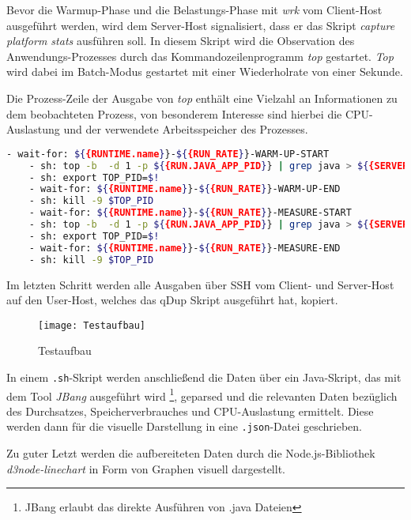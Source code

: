 Bevor die Warmup-Phase und die Belastungs-Phase mit \textit{wrk} vom Client-Host ausgeführt werden, wird dem Server-Host signalisiert, dass
er das Skript \textit{capture platform stats} ausführen soll.
In diesem Skript wird die Observation des Anwendungs-Prozesses durch das Kommandozeilenprogramm \textit{top} gestartet.
\textit{Top} wird dabei im Batch-Modus gestartet mit einer Wiederholrate von einer Sekunde.

Die Prozess-Zeile der Ausgabe von \textit{top} enthält eine Vielzahl an Informationen zu dem beobachteten Prozess, von besonderem
Interesse sind hierbei die CPU-Auslastung und der verwendete Arbeitsspeicher des Prozesses.

\begin{lstlisting}[language=sh, caption=Auszug des qDup Skripts capture-platform-stats, captionpos=b]
    - wait-for: ${{RUNTIME.name}}-${{RUN_RATE}}-WARM-UP-START
    - sh: top -b  -d 1 -p ${{RUN.JAVA_APP_PID}} | grep java > ${{SERVER_FILE_PATH}}/output/${{RUNTIME.name}}-${{RUN_RATE}}-WARM-UP-top.out &
    - sh: export TOP_PID=$!
    - wait-for: ${{RUNTIME.name}}-${{RUN_RATE}}-WARM-UP-END
    - sh: kill -9 $TOP_PID
    - wait-for: ${{RUNTIME.name}}-${{RUN_RATE}}-MEASURE-START
    - sh: top -b  -d 1 -p ${{RUN.JAVA_APP_PID}} | grep java > ${{SERVER_FILE_PATH}}/output/${{RUNTIME.name}}-${{RUN_RATE}}-MEASURE-top.out &
    - sh: export TOP_PID=$!
    - wait-for: ${{RUNTIME.name}}-${{RUN_RATE}}-MEASURE-END
    - sh: kill -9 $TOP_PID
  \end{lstlisting}

Im letzten Schritt werden alle Ausgaben über SSH vom Client- und Server-Host auf den User-Host, welches das qDup Skript ausgeführt hat, kopiert.

\begin{figure}[h!]
    \centering
    \texttt{[image: Testaufbau]}
    \caption{Testaufbau}
\end{figure}

In einem \verb|.sh|-Skript werden anschließend die Daten über ein Java-Skript, das mit dem Tool \textit{JBang} ausgeführt
wird \footnote{JBang erlaubt das direkte Ausführen von .java Dateien},
geparsed und die relevanten Daten bezüglich des Durchsatzes, Speicherverbrauches und CPU-Auslastung ermittelt.
Diese werden dann für die visuelle Darstellung in eine \verb|.json|-Datei geschrieben.

Zu guter Letzt werden die aufbereiteten Daten durch die Node.js-Bibliothek \textit{d3node-linechart} in Form von Graphen visuell dargestellt.

